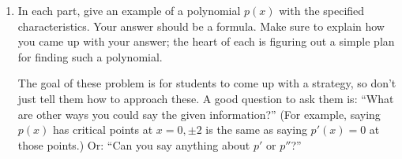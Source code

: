 \documentclass{article}
\begin{document}
\begin{enumerate}
\begin{enumerate}
  \item

    \begin{grading}
      1 point
    \end{grading}

    \begin{problem}[\stretch{0.25}]
      Are the turning points of $f$ half-way between the roots of $f$? 
    \end{problem}

    \begin{solution}
      No. $x=-5/3$ is not half-way between $x=-3$ and $x=0$, and
      $x=3$ is not half-way between $x=0$ and $x=5$.
    \end{solution}

  \item

    \begin{grading}
      1 point
    \end{grading}

    \begin{problem}[\nstretch{0.35}]
      Does $f$ have a global maximum on $(-\infty, \infty)$? How about a global minimum? Explain how you know. 
    \end{problem}

    \begin{solution}
      $f$ has neither a global maximum nor a global minimum on $(-\infty,
      \infty)$. This is because $\lim\limits_{x\to\infty}f(x)=-\infty$ and 
      $\lim\limits_{x\to-\infty} f(x)=\infty$.
    \end{solution}

  \end{enumerate}

\item In each part, give an example of a polynomial $p(x)$ with the specified characteristics. Your answer should be a formula. Make sure to explain how you came up with your answer; the heart of each is figuring out a simple plan for finding such a polynomial. 

  \begin{workshop}
    The goal of these problem is for students to come up with a strategy, so don't just tell them how to approach these. A good question to ask them is: ``What are other ways you could say the given information?'' (For example, saying $p(x)$ has critical points at $x = 0, \pm 2$ is the same as saying $p'(x) = 0$ at those points.) Or: ``Can you say anything about $p'$ or $p''$?''
  \end{workshop}


\end{enumerate}
\end{document}
